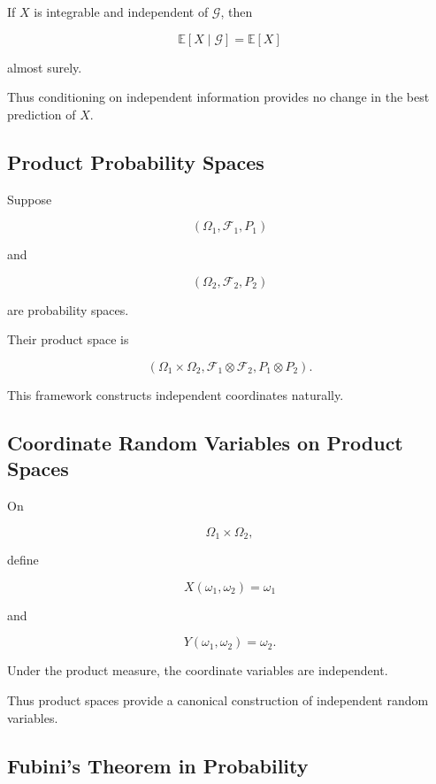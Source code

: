 If \(X\) is integrable and independent of \(\mathcal{G}\), then

\[
\boxed{
\mathbb{E}[X\mid\mathcal{G}]
=
\mathbb{E}[X]
}
\]

almost surely.

Thus conditioning on independent information provides no change in the
best prediction of \(X\).

\subsection{Product Probability Spaces}
\label{subsec:product-probability-spaces}

Suppose

\[
(\Omega_1,\mathcal{F}_1,P_1)
\]

and

\[
(\Omega_2,\mathcal{F}_2,P_2)
\]

are probability spaces.

Their product space is

\[
\boxed{
(\Omega_1\times\Omega_2,
\mathcal{F}_1\otimes\mathcal{F}_2,
P_1\otimes P_2).
}
\]

This framework constructs independent coordinates naturally.

\subsection{Coordinate Random Variables on Product Spaces}
\label{subsec:coordinate-rvs-product}

On

\[
\Omega_1\times\Omega_2,
\]

define

\[
X(\omega_1,\omega_2)
=
\omega_1
\]

and

\[
Y(\omega_1,\omega_2)
=
\omega_2.
\]

Under the product measure, the coordinate variables are independent.

Thus product spaces provide a canonical construction of independent
random variables.

\subsection{Fubini's Theorem in Probability}
\label{subsec:fubini-probability}


